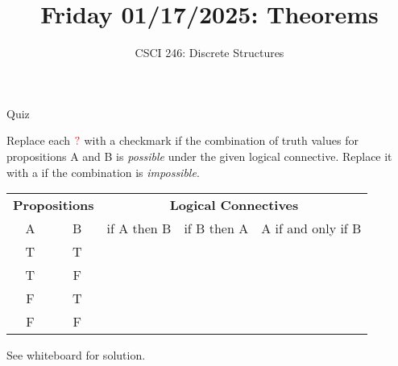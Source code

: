 \documentclass[10pt]{beamer}
\begin{document}






\title{Friday 01/17/2025: Theorems}
\author{CSCI 246: Discrete Structures}

\begin{frame}
    \titlepage 
\end{frame}



\begin{frame}{Quiz}

Replace each $\color{red}{?} \color{black}$ with a checkmark \greencheck if the combination of truth values for propositions A and B is \textit{possible} under the given logical connective.  Replace it with a \redx if the combination is \textit{impossible}.

\begin{table}
\centering
\begin{tabular}{cc|ccc}
\multicolumn{2}{c}{\textbf{Propositions}} & \multicolumn{3}{c}{\textbf{Logical Connectives}} \\
A  & B & if A then B & if B then A & A if and only if B \\
\hline 
T & T & \red{?} & \red{?} & \red{?}\\
T & F &\red{?}  & \red{?} & \red{?} \\
F & T & \red{?} & \red{?} & \red{?} \\
F & F & \red{?} &\red{?}  & \red{?}
\end{tabular}
\end{table}
\vfill \vfill \vfill 
\pause 
\alertstar \alert{See whiteboard for solution.}
\end{frame}
\end{document}
